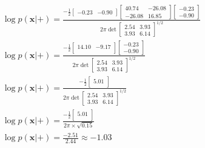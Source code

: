 \documentclass[leqno]{article}
\begin{document}
\begin{gather*}
\begin{split}
&\log p(\textbf{x}|+) = 
\frac{-\frac{1}{2}\begin{bmatrix}
   -0.23 & -0.90 
\end{bmatrix}\begin{bmatrix}
   40.74 & -26.08\\
   -26.08 & 16.85 
\end{bmatrix}\begin{bmatrix}
   -0.23\\
   -0.90 
\end{bmatrix}}{2\pi\det{\begin{bmatrix}
   2.54 & 3.93\\
   3.93 & 6.14 
\end{bmatrix}}^{1/2}}\\
&\log p(\textbf{x}|+) = 
\frac{-\frac{1}{2}\begin{bmatrix}
   14.10 & -9.17\\ 
\end{bmatrix}\begin{bmatrix}
   -0.23\\
   -0.90 
\end{bmatrix}}{2\pi\det{\begin{bmatrix}
   2.54 & 3.93\\
   3.93 & 6.14 
\end{bmatrix}}^{1/2}}\\
&\log p(\textbf{x}|+) = 
\frac{-\frac{1}{2}\begin{bmatrix}
   5.01\\ 
\end{bmatrix}}{2\pi\det{\begin{bmatrix}
   2.54 & 3.93\\
   3.93 & 6.14 
\end{bmatrix}}^{1/2}}\\
&\log p(\textbf{x}|+) = 
\frac{-\frac{1}{2}\begin{bmatrix}
   5.01\\ 
\end{bmatrix}}{2\pi \times \sqrt{0.15}}\\
&\log p(\textbf{x}|+) = 
\frac{-2.51}{2.44}  \approx -1.03
\end{split}
\end{gather*}
\end{document}
